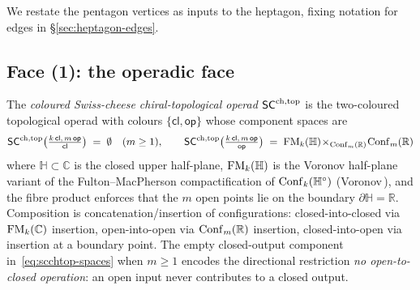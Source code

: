 We restate the pentagon vertices as inputs to the heptagon, fixing
notation for edges in \S\ref{sec:heptagon-edges}.

\subsection{Face (1): the operadic face}\label{subsec:face-operadic}

\begin{definition}\label{def:factorization-swiss-cheese-operad}%
The \emph{coloured Swiss-cheese chiral-topological operad} $\mathsf{SC}^{\mathrm{ch},\mathrm{top}}$
is the two-coloured topological operad with colours $\{\mathsf{cl},
\mathsf{op}\}$ whose component spaces are
\begin{equation}\label{eq:scchtop-spaces}
 \mathsf{SC}^{\mathrm{ch},\mathrm{top}}\bigl(\tfrac{k\,\mathsf{cl},\,m\,\mathsf{op}}{\mathsf{cl}}\bigr)
 \;=\;\emptyset\quad(m\geq 1),\qquad
 \mathsf{SC}^{\mathrm{ch},\mathrm{top}}\bigl(\tfrac{k\,\mathsf{cl},\,m\,\mathsf{op}}{\mathsf{op}}\bigr)
 \;=\;\mathrm{FM}_k(\mathbb{H})\!\times_{\mathrm{Conf}_m(\mathbb{R})}\!\mathrm{Conf}_m(\mathbb{R})
\end{equation}
where $\mathbb{H}\subset\mathbb{C}$ is the closed upper half-plane,
$\mathrm{FM}_k(\mathbb{H})$ is the Voronov half-plane variant of the
Fulton--MacPherson compactification of $\mathrm{Conf}_k(\mathbb{H}^\circ)$
(Voronov\,\cite{Voronov1998}), and the fibre product enforces that the
$m$ open points lie on the boundary $\partial\mathbb{H}=\mathbb{R}$.
Composition is concatenation/insertion of configurations:
closed-into-closed via $\mathrm{FM}_k(\mathbb{C})$ insertion, open-into-open
via $\mathrm{Conf}_m(\mathbb{R})$ insertion, closed-into-open via insertion at
a boundary point. The empty closed-output component
in~\eqref{eq:scchtop-spaces} when $m\geq 1$ encodes the directional
restriction \emph{no open-to-closed operation}: an open input never
contributes to a closed output.


\end{definition}
